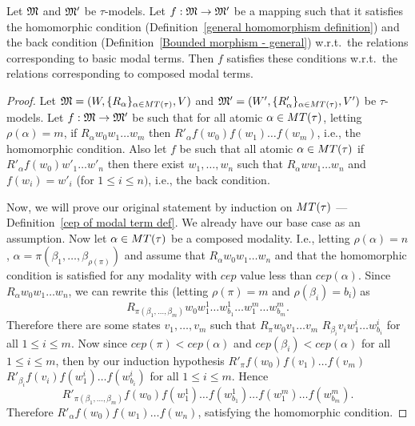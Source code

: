 
\begin{lemma}\label{if homomorphic and back condition on atomic then also on composed}
    Let $\mathfrak{M}$ and $\mathfrak{M}'$ be $\tau$-models. Let $f:\mathfrak{M}\to\mathfrak{M}'$ be a mapping such that it satisfies the homomorphic condition (Definition~\ref{general homomorphism definition}) and the back condition (Definition~\ref{Bounded morphism - general}) w.r.t.\ the relations corresponding to basic modal terms. Then $f$ satisfies these conditions w.r.t.\ the relations corresponding to composed modal terms.
\end{lemma}

\begin{proof}
    Let $\mathfrak{M}=(W,\{ R_{\alpha} \}_{\alpha \in MT(\tau)},V)$ and $\mathfrak{M}'=(W',\{ R'_{\alpha} \}_{\alpha \in MT(\tau)},V')$ be $\tau$-models. Let $f:\mathfrak{M}\to\mathfrak{M}'$ be such that for all atomic $\alpha\in MT(\tau)$, letting $\rho(\alpha) =m$, if $R_\alpha w_0w_1\ldots w_m$ then $R'_\alpha f(w_0)f(w_1)\ldots f(w_m)$,
    i.e., the homomorphic condition. Also let $f$ be such that all atomic $\alpha\in MT(\tau)$ if $R'_\alpha f(w_0)w'_1\ldots w'_n$ then there exist $w_1,\ldots, w_n$ such that $R_\alpha ww_1\ldots w_n$ and $f(w_i) = w'_i$ (for $1\leq i \leq n)$, i.e., the back condition.
    \par Now, we will prove our original statement by induction on $MT(\tau)$ --- Definition~\ref{cep of modal term def}. We already have our base case as an assumption. Now let $\alpha\in MT(\tau)$ be a composed modality. I.e., letting $\rho(\alpha) = n$, $\alpha = \pi(\beta_1,\ldots,\beta_{\rho(\pi)})$ and assume that $R_\alpha w_0w_1\ldots w_n$ and that the homomorphic condition is satisfied for any modality with $cep$ value less than $cep(\alpha)$. Since $R_\alpha w_0w_1\ldots w_n$, we can rewrite this (letting $\rho(\pi) = m$ and $\rho(\beta_i) = b_i$) as $$R_{\pi(\beta_1,\ldots,\beta_m)} w_0w^1_1\ldots w^1_{b_1} \ldots w^m_1\ldots w^m_{b_m}.$$ Therefore there are some states $v_1,\ldots,v_m$ such that $R_\pi w_0v_1\ldots v_m$  $R_{\beta_i} v_iw^i_1\ldots w^i_{b_i}$ for all $1\leq i \leq m$. Now since $cep(\pi)<cep(\alpha)$ and $cep(\beta_i)<cep(\alpha)$ for all $1\leq i \leq m$, then by our induction hypothesis $R'_\pi f(w_0)f(v_1)\ldots f(v_m)$  $R'_{\beta_i} f(v_i)f(w^i_1)\ldots f(w^i_{b_i})$ for all $1\leq i \leq m$. Hence $$R'_{\pi(\beta_1,\ldots,\beta_m)} f(w_0)f(w^1_1)\ldots f(w^1_{b_1}) \ldots f(w^m_1)\ldots f(w^m_{b_m}).$$ Therefore $R'_\alpha f(w_0)f(w_1)\ldots f(w_n)$, satisfying the homomorphic condition.

\end{proof}
